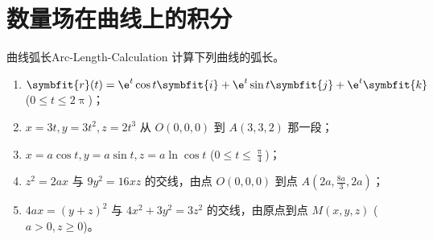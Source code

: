 \section{数量场在曲线上的积分}

\begin{problem}{曲线弧长}{Arc-Length-Calculation}
    计算下列曲线的弧长。
    \begin{enumerate}
        \item $\symbfit{r}(t) = \e^t \cos t \symbfit{i} + \e^t \sin t \symbfit{j} + \e^t \symbfit{k}$ ($0 \le t \le 2\uppi$)；
        \item $x = 3t, y = 3t^2, z = 2t^3$ 从 $O(0,0,0)$ 到 $A(3,3,2)$ 那一段；
        \item $x = a \cos t, y = a \sin t, z = a \ln \cos t$ ($0 \le t \le \frac{\uppi}{4}$)；
        \item $z^2 = 2ax$ 与 $9y^2 = 16xz$ 的交线，由点 $O(0,0,0)$ 到点 $A(2a, \frac{8a}{3}, 2a)$；
        \item $4ax = (y+z)^2$ 与 $4x^2 + 3y^2 = 3z^2$ 的交线，由原点到点 $M(x,y,z)$ ($a > 0, z \ge 0$)。
    \end{enumerate}
\end{problem}

